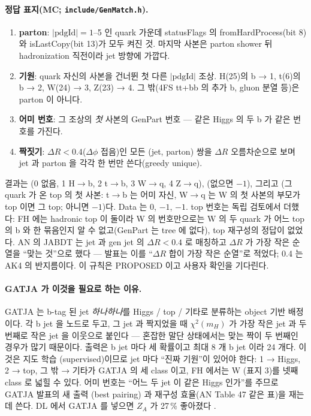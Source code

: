 \paragraph{정답 표지(MC; \texttt{include/GenMatch.h}).}
\begin{enumerate}
\item \textbf{parton}: $|\text{pdgId}|=1$–5 인 quark 가운데 statusFlags 의 fromHardProcess(bit 8)와 isLastCopy(bit 13)가 모두 켜진 것. 마지막 사본은
      parton shower 뒤 hadronization 직전이라 jet 방향에 가깝다.
\item \textbf{기원}: quark 자신의 사본을 건너뛴 첫 다른 $|\text{pdgId}|$ 조상. H(25)의 b → 1, t(6)의 b → 2, W(24) → 3, Z(23) → 4. 그 밖(4FS tt+bb 의 추가
      b, gluon 분열 등)은 parton 이 아니다.
\item \textbf{어미 번호}: 그 조상의 \emph{첫} 사본의 GenPart 번호 — 같은 Higgs 의 두 b 가 같은 번호를 가진다.
\item \textbf{짝짓기}: $\Delta R<0.4$($\Delta\phi$ 접음)인 모든 (jet, parton) 쌍을 $\Delta R$ 오름차순으로 보며 jet 과 parton 을 각각 한 번만 쓴다(greedy unique).
\end{enumerate}
결과는 (0 없음, 1 H$\to$b, 2 t$\to$b, 3 W$\to$q, 4 Z$\to$q), (없으면 $-1$), 그리고
(그 quark 가 온 top 의 첫 사본: t$\to$b 는 어미 자신, W$\to$q 는 W 의 첫 사본의 부모가 top 이면 그 top; 아니면 $-1$)다.
Data 는 0, $-1$, $-1$. top 번호는 독립 검토에서 더했다\tagimpl\tagtest: FH 에는 hadronic top 이 둘이라
W 의 번호만으로는 W 의 두 quark 가 어느 top 의 b 와 한 묶음인지 알 수 없고(GenPart 는 tree 에 없다), top 재구성의 정답이 없었다. AN 의 JABDT 는 jet 과 gen jet 의 $\Delta R<0.4$ 로 매칭하고 $\Delta R$ 가 가장 작은 순열을 ``맞는 것''으로 했다
 — 발표는 이를 ``$\Delta R$ 합이 가장 작은 순열''로 적었다; 0.4 는 AK4 의 반지름이다. 이 규칙은 PROPOSED 이고 사용자 확인을 기다린다\tagopen.

\paragraph{GATJA 가 이것을 필요로 하는 이유.}
GATJA 는 b-tag 된 jet \emph{하나하나}를 Higgs / top / 기타로 분류하는 object 기반 배정이다. 각 b jet 을 노드로 두고, 그 jet 과
짝지었을 때 $\chi^2(m_H)$ 가 가장 작은 jet 과 두 번째로 작은 jet 을 이웃으로 붙인다 — 혼잡한 말단 상태에서는 맞는 짝이 두 번째인 경우가 많기
때문이다. 출력은 b jet 마다 세 확률이고 최대 8 개 b jet 이라 24 개다. 이것은 지도 학습
(supervised)이므로 jet 마다 ``진짜 기원''이 있어야 한다:  1 → Higgs, 2 → top, 그 밖 → 기타가 GATJA 의 세 class 이고, FH 에서는 W
(표지 3)를 넷째 class 로 넓힐 수 있다. 어미 번호는 ``어느 두 jet 이 같은 Higgs 인가''를 주므로 GATJA 발표의 새 출력
(best pairing) 과 \chisq{} 재구성 효율(AN Table 47 같은 표)을 재는 데 쓴다. DL 에서 GATJA 를 넣으면 $Z_A$ 가 27\,\% 좋아졌다
.

